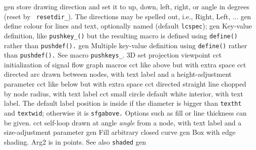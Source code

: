  {gen}
  {store drawing direction and set it to
    up, down, left, right, or angle in degrees (reset by {\tt
    resetdir\_}).  The directions may be spelled out, i.e., Right,
    Left, $\ldots$
   }
  {gen}
  {define colour for lines and text, optionally named (default
   {\tt lcspec}); }
  {gen}
  {Key-value definition, like {\tt pushkey\_()} but the resulting
  macro is defined using {\tt define()} rather than {\tt pushdef().}
   }
  {gen}
  {Multiple key-value definition using {\tt define()} rather than
   {\tt pushdef().} See macro {\tt pushkeys\_}.
   }
  {3D} {set projection viewpoint}
 {cct}
  {initialization of signal
  flow graph macros}
  {cct}
  {like above but with extra space}
  {cct}
  {directed arc drawn between nodes, with text label
    and a height-adjustment parameter }
  {cct}
  {like below but with extra space}
  {cct}
  {directed straight line chopped by node radius, with text label}
  {cct}
  {small circle default white interior, with text label. The default
  label position is inside if the diameter is bigger than {\tt textht}
  and {\tt textwid}; otherwise it is {\tt sfgabove.} Options such as
  fill or line thickness can be given.}
  {cct}
  {self-loop drawn at angle {\sl angle} from a node,
     with text label and a size-adjustment parameter }
  {gen}
  {Fill arbitrary closed curve}
  {gen}
  {Box with edge shading.  Arg2 is in points. See also {\tt shaded} }
 {gen}
